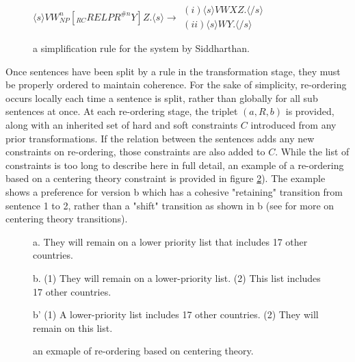 \begin{figure}[H]
\centering

$ \langle s \rangle V W^n_{NP} [_{RC} RELPR^{\#n}Y]Z. \langle s \rangle \rightarrow \begin{aligned} (i) \langle s \rangle V W X Z.  \langle /s \rangle \\ (ii)  \langle s \rangle W Y. \langle /s \rangle \end{aligned}  $

\caption{a simplification rule for the system by Siddharthan.}
\label{fig:simprule}
\end{figure}


{Once sentences have been split by a rule in the transformation stage, they must be properly ordered to maintain coherence.  For the sake of simplicity, re-ordering occurs locally each time a sentence is split, rather than globally for all sub sentences at once.  At each re-ordering stage, the triplet $(a, R, b)$ is provided, along with an inherited set of hard and soft constraints $ C $ introduced from any prior transformations. If the relation between the sentences adds any new constraints on re-ordering, those constraints are also added to $C$.  While the list of constraints is too long to describe here in full detail, an example of a re-ordering based on a centering theory constraint is provided in figure \ref{fig:cent-theory}). The example shows a preference for version b which has a cohesive "retaining" transition from sentence 1 to 2, rather than a "shift" transition as shown in b (see \citet{grosz1995centering} for more on centering theory transitions).}


\begin{figure}[H]
\centering
\begin{footnotesize}

a.  They will remain on a lower priority list that includes 17 other countries.

b. (1) They will remain on a lower-priority list.  (2) This list includes 17 other countries.

b' (1) A lower-priority list includes 17 other countries.  (2) They will remain on this list.

\end{footnotesize}
\caption{an exmaple of re-ordering based on centering theory.}
\label{fig:cent-theory}
\end{figure}


